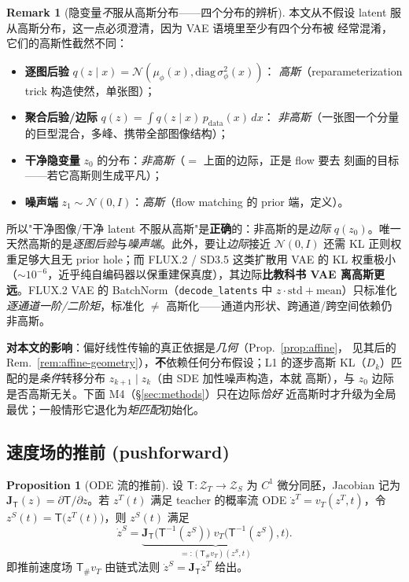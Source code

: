 \documentclass[11pt,a4paper]{article}
\newcommand{\N}{\mathcal{N}}
\newcommand{\Zt}{\mathcal{Z}_T}
\newcommand{\Zs}{\mathcal{Z}_S}
\newcommand{\Tmap}{\mathsf{T}}
\newcommand{\push}{\#}
\newcommand{\vT}{v_{T}}
\newcommand{\Jac}{\mathbf{J}}
\theoremstyle{definition}
\newtheorem{remark}{Remark}
\newtheorem{proposition}{Proposition}
\begin{document}
\begin{remark}[隐变量\emph{不}服从高斯分布——四个分布的辨析]
\label{rem:not-gaussian}
本文从不假设 latent 服从高斯分布，这一点必须澄清，因为 VAE 语境里至少有四个分布被
经常混淆，它们的高斯性截然不同：
\begin{itemize}[leftmargin=1.5em]
\item \textbf{逐图后验} $q(z\mid x)=\N(\mu_\phi(x),\mathrm{diag}\,\sigma_\phi^2(x))$：
\emph{高斯}（reparameterization trick 构造使然，单张图）；
\item \textbf{聚合后验/边际} $q(z)=\int q(z\mid x)\,p_{\mathrm{data}}(x)\,dx$：
\emph{非高斯}（一张图一个分量的巨型混合，多峰、携带全部图像结构）；
\item \textbf{干净隐变量} $z_0$ 的分布：\emph{非高斯}（$=$ 上面的边际，正是 flow 要去
刻画的目标——若它高斯则生成平凡）；
\item \textbf{噪声端} $z_1\sim\N(0,I)$：\emph{高斯}（flow matching 的 prior 端，定义）。
\end{itemize}
所以"干净图像/干净 latent 不服从高斯"是\textbf{正确}的：非高斯的是\emph{边际}
$q(z_0)$。唯一天然高斯的是\emph{逐图后验}与\emph{噪声端}。此外，要让\emph{边际}接近
$\N(0,I)$ 还需 KL 正则权重足够大且无 prior hole；而 FLUX.2 / SD3.5 这类扩散用 VAE 的
KL 权重极小（$\sim 10^{-6}$，近乎纯自编码器以保重建保真度），其边际\textbf{比教科书
VAE 离高斯更远}。FLUX.2 VAE 的 BatchNorm（\texttt{decode\_latents} 中
$z\cdot\mathrm{std}+\mathrm{mean}$）只标准化\emph{逐通道一阶/二阶矩}，标准化 $\neq$
高斯化——通道内形状、跨通道/跨空间依赖仍非高斯。

\textbf{对本文的影响}：偏好线性传输的真正依据是\emph{几何}（Prop.~\ref{prop:affine}，
见其后的 Rem.~\ref{rem:affine-geometry}），\textbf{不}依赖任何分布假设；L1 的逐步高斯
KL（$D_k$）匹配的是\emph{条件}转移分布 $z_{k+1}\mid z_k$（由 SDE 加性噪声构造，本就
高斯），与 $z_0$ 边际是否高斯无关。下面 M4（\S\ref{sec:methods}）只在边际\emph{恰好}
近高斯时才升级为全局最优；一般情形它退化为\emph{矩匹配}初始化。
\end{remark}

\subsection{速度场的推前 (pushforward)}

\begin{proposition}[ODE 流的推前]
\label{prop:pushforward}
设 $\Tmap:\Zt\to\Zs$ 为 $C^1$ 微分同胚，Jacobian 记为
$\Jac_{\Tmap}(z)=\partial \Tmap/\partial z$。若 $z^T(t)$ 满足
teacher 的概率流 ODE $\dot z^T=\vT(z^T,t)$，令 $z^S(t)=\Tmap\big(z^T(t)\big)$，则
$z^S(t)$ 满足
\begin{equation}
\dot z^S
=\underbrace{\Jac_{\Tmap}\!\big(\Tmap^{-1}(z^S)\big)\;
\vT\big(\Tmap^{-1}(z^S),t\big)}_{\displaystyle =:(\Tmap_\push\vT)(z^S,t)}.
\label{eq:pushforward}
\end{equation}
即推前速度场 $\Tmap_\push\vT$ 由链式法则 $\dot z^S=\Jac_{\Tmap}\dot z^T$ 给出。
\end{proposition}
\end{document}
